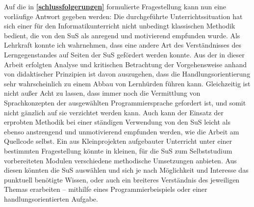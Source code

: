 \documentclass[paper=a4, DIV=13, BCOR=12mm, twoside=on, onecolumn=on, open = any, titlepage =on, parskip =half-, headsepline = on, footsepline = on, chapterprefix = on, sectionprefix = on, appendixprefix = off, fontsize = 12pt, numbers = noenddot, abstract = off]{scrreprt}
\begin{document}
Auf die in \textbf{\ref{schlussfolgerungen}} formulierte Fragestellung kann nun eine vorläufige Antwort gegeben werden: Die durchgeführte Unterrichtssituation hat sich einer für den Informatikunterricht nicht unbedingt klassischen Methodik bedient, die von den SuS als anregend und motivierend empfunden wurde. Als Lehrkraft konnte ich wahrnehmen, dass eine andere Art des Verständnisses des Lerngegenstandes auf Seiten der SuS gefördert werden konnte. Aus der in dieser Arbeit erfolgten Analyse und kritischen Betrachtung der Vorgehensweise anhand von didaktischer Prinzipien ist davon auszugehen, dass die Handlungsorientierung sehr wahrscheinlich zu einem Abbau von Lernhürden führen kann.
Gleichzeitig ist nicht außer Acht zu lassen, dass immer noch die Vermittlung von Sprachkonzepten der ausgewählten Programmiersprache gefordert ist, und somit nicht gänzlich auf sie verzichtet werden kann. Auch kann der Einsatz der erprobten Methodik bei einer ständigen Verwendung von den SuS leicht als ebenso anstrengend und unmotivierend empfunden werden, wie die Arbeit am Quellcode selbst. Ein aus Kleinprojekten aufgebauter Unterricht unter einer bestimmten Fragestellung könnte in kleinen, für die SuS zum Selbststudium vorbereiteten Modulen verschiedene methodische Umsetzungen anbieten. Aus diesen könnten die SuS auswählen und sich je nach Möglichkeit und Interesse das punktuell benötigte Wissen, oder auch ein breiteres Verständnis des jeweiligen Themas erarbeiten --  mithilfe eines Programmierbeispiels oder einer handlungsorientierten Aufgabe.








\newpage

\newpage

\end{document}
